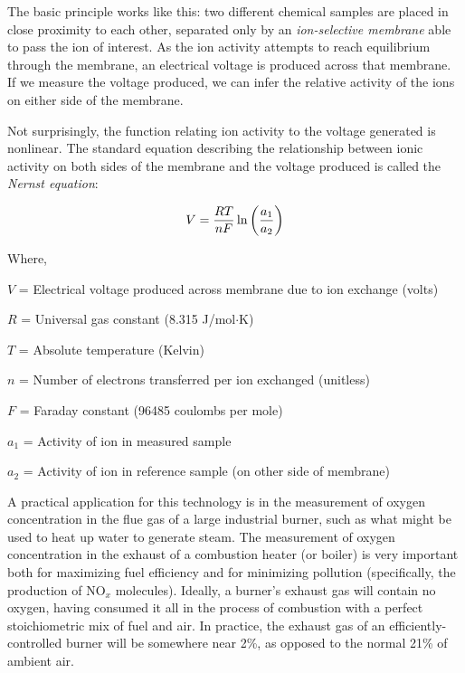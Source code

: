 The basic principle works like this: two different chemical samples are placed in close proximity to each other, separated only by an \textit{ion-selective membrane} able to pass the ion of interest.  As the ion activity attempts to reach equilibrium through the membrane, an electrical voltage is produced across that membrane.  If we measure the voltage produced, we can infer the relative activity of the ions on either side of the membrane. 

Not surprisingly, the function relating ion activity to the voltage generated is nonlinear.  The standard equation describing the relationship between ionic activity on both sides of the membrane and the voltage produced is called the \textit{Nernst equation}: 

$$V = {{R T} \over {nF}} \ln \left({a_1 \over a_2}\right)$$

\noindent
Where,

$V$ = Electrical voltage produced across membrane due to ion exchange (volts)

$R$ = Universal gas constant (8.315 J/mol$\cdot$K)

$T$ = Absolute temperature (Kelvin)

$n$ = Number of electrons transferred per ion exchanged (unitless)

$F$ = Faraday constant (96485 coulombs per mole)

$a_1$ = Activity of ion in measured sample

$a_2$ = Activity of ion in reference sample (on other side of membrane)

\vskip 10pt

A practical application for this technology is in the measurement of oxygen concentration in the flue gas of a large industrial burner, such as what might be used to heat up water to generate steam.  The measurement of oxygen concentration in the exhaust of a combustion heater (or boiler) is very important both for maximizing fuel efficiency and for minimizing pollution (specifically, the production of NO$_{x}$ molecules).  Ideally, a burner's exhaust gas will contain no oxygen, having consumed it all in the process of combustion with a perfect stoichiometric mix of fuel and air.  In practice, the exhaust gas of an efficiently-controlled burner will be somewhere near 2\%, as opposed to the normal 21\% of ambient air.  

\filbreak

